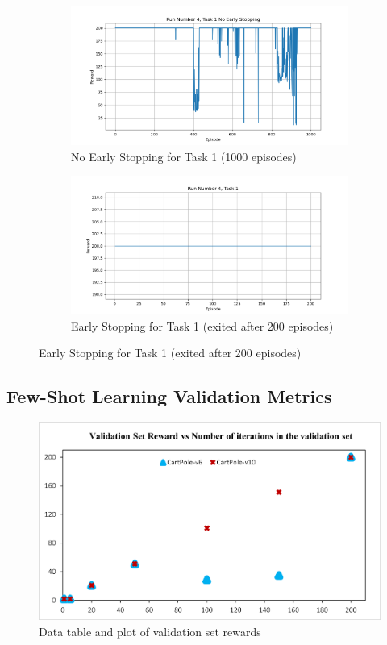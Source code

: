 \documentclass[runningheads]{llncs}
\begin{document}
   \begin{figure}[H]
    \begin{subfigure}{.45\textwidth}
        \centering
        \includegraphics[width=1\textwidth] {imgs/no_early_stopping/Task_1_run_4_no_es} 
        \caption{No Early Stopping for Task 1 (1000 episodes)}
    \end{subfigure} 
         \begin{subfigure}{.45\textwidth}
        \centering
        \includegraphics[width=1\textwidth] {imgs/1000_episodes/Task_1_run_4}
        \caption{Early Stopping for Task 1 (exited after 200 episodes)}
    \end{subfigure}
    \end{figure}

\subsection{Few-Shot Learning Validation Metrics}

 \begin{figure}[H]
   \centering
      \includegraphics[scale=0.6]{validation_reward}
       \caption{Data table and plot of validation set rewards}
 \end{figure}
 
\end{document}
